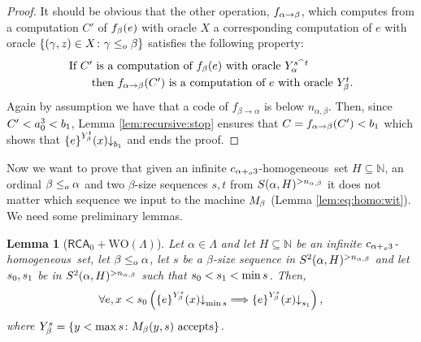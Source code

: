 \documentclass[11pt]{amsart}
\newtheorem{lemma}[thm]{Lemma}
\theoremstyle{definition}
\theoremstyle{remark}
\theoremstyle{plain}
\newcommand{\numberset}{\mathbb}
\newcommand{\N}{\numberset{N}}
\def\a{\alpha}
\def\b{\beta}
\def\conc{{}^\smallfrown}
\newcommand{\RCA}{\mathsf{RCA}_0}
\newcommand{\set}[1]{{\{{#1}\}}}
\def\stops{{\downarrow}}
\def\WO{{\textrm{WO}}}
\newcommand{\leqo}{\leq\sb{o}}
\newcommand{\pluso}{+\sb{o}}
\def\N{{\mathbb{N}}}
\def\stops{{\downarrow}}
\newcommand{\homo}{homogeneous}
\begin{document}
\begin{proof}
It should be obvious that the other operation, $f\sb{\alpha \rightarrow \beta}$, which computes from a computation $C'$ of $f\sb \beta(e)$ with oracle $X$ a corresponding computation of $e$ with oracle $\set{(\gamma,z)\in X\colon \gamma\leqo \beta}$ satisfies the following property:
\begin{equation}\label{eq:f:alpha:beta}
\begin{split}
\lefteqn{\mbox{If $C'$ is a computation of $f\sb \beta(e)$ with
oracle $Y\sb \alpha \sp {s \conc t}$}}&\\ 
&\mbox{\ \ \ \ \ \ then $f\sb{\alpha\rightarrow \beta}(C')$ is a computation of $e$ with oracle $Y\sb \beta \sp t$.}
\end{split}
\end{equation}
Again by assumption we have that a code of $f_{\beta \to \alpha}$ is below $n_{\a,\b}$. 
Then, since $C'<a\sp{3}\sb0 < b_1$, Lemma \ref{lem:recursive:stop} ensures that 
$C=f\sb{\alpha\rightarrow\beta}(C')<b\sb 1$ which shows that $\set{e}\sp{Y\sb \beta \sp t}(x)\stops\sb{b\sb 1}$ and ends the proof.
\end{proof}

Now we want to prove that given an infinite $c\sb{\alpha\pluso3}$-\homo\ set $H\subseteq\N$, an ordinal $\beta\leqo \alpha$ and two $\beta$-size sequences $s,t$ from $S(\alpha,H)\sp{>n_{\a,\b}}$ it does not matter which sequence we input to the machine $M\sb\beta$ (Lemma \ref{lem:eq:homo:wit}).
We need some preliminary lemmas.

\begin{lemma}[$\RCA+\WO(\Lambda)$]\label{lem:bounding:computations}
Let $\alpha\in\Lambda$ and let $H\subseteq\N$ be an infinite $c\sb{\alpha \pluso3}$-\homo\ set, let $\beta\leqo \alpha$, let $s$ be a $\beta$-size sequence in $S\sp2(\alpha,H)\sp{>n_{\a,\b}}$ and let $s\sb0, s\sb1$ be in $S\sp2(\alpha,H)\sp{>n_{\a,\b}}$ such that $s\sb0 < s\sb1 < \min s$. 
Then, 
$$\forall e,x<s\sb0 \left(\set{e}\sp {Y \sb \beta \sp s}(x)\stops\sb {\min s}\Longrightarrow \set{e}\sp {Y \sb \beta \sp s}(x)\stops\sb {s\sb1}\right),$$
where $Y_\beta^s =\set{y<\max s\colon M\sb\beta(y,s)\mbox{ accepts}}$. 
\end{lemma}
\end{document}
